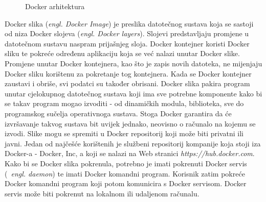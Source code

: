\begin{figure}[h]
    \centering

    \caption{Docker arhitektura}%
    \label{fig:02docker}
\end{figure}

Docker slika (\textit{engl. Docker Image}) je preslika datotečnog sustava koja se sastoji od niza
Docker slojeva (\textit{engl. Docker layers}). Slojevi predstavljaju promjene u datotečnom sustavu
naspram prijašnjeg sloja. Docker kontejner koristi Docker sliku te pokreće određenu aplikaciju koja
se već nalazi unutar Docker slike. Promjene unutar Docker kontejnera, kao što je zapis novih
datoteka, ne mijenjaju Docker sliku korištenu za pokretanje tog kontejnera. Kada se Docker
kontejner zaustavi i obriše, svi podatci su također obrisani. Docker slika pakira program unutar
cjelokupnog datotečnog sustava koji ima sve potrebne komponente kako bi se takav program mogao
izvoditi - od dinamičkih modula, biblioteka, sve do programskog sučelja operativnoga sustava. Stoga
Docker garantira da će izvršavanje takvog sustava bit uvijek jednako, neovisno o računalo na kojemu
se izvodi. Slike mogu se spremiti u Docker repositorij koji može biti privatni ili javni. Jedan od
najčešće korištenih je službeni repositorij kompanije koja stoji iza Docker-a - Docker, Inc, a koji
se nalazi na Web stranici \textit{https://hub.docker.com}. Kako bi se Docker slika pokrenula,
potrebno je imati pokrenuti Docker servis (~\textit{engl. daemon}) te imati Docker komandni
program. Korisnik zatim pokreće Docker komandni program koji potom komunicira s Docker servisom.
Docker servis može biti pokrenut na lokalnom ili udaljenom računalu.

